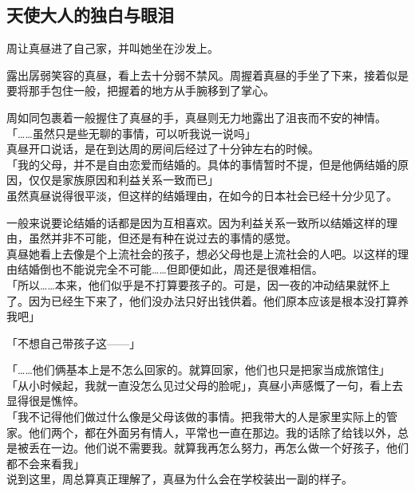 \subsection{天使大人的独白与眼泪}

周让真昼进了自己家，并叫她坐在沙发上。

露出孱弱笑容的真昼，看上去十分弱不禁风。周握着真昼的手坐了下来，接着似是要将那手包住一般，把握着的地方从手腕移到了掌心。

周如同包裹着一般握住了真昼的手，真昼则无力地露出了沮丧而不安的神情。\\

「……虽然只是些无聊的事情，可以听我说一说吗」\\

真昼开口说话，是在到达周的房间后经过了十分钟左右的时候。\\

「我的父母，并不是自由恋爱而结婚的。具体的事情暂时不提，但是他俩结婚的原因，仅仅是家族原因和利益关系一致而已」\\

虽然真昼说得很平淡，但这样的结婚理由，在如今的日本社会已经十分少见了。

一般来说要论结婚的话都是因为互相喜欢。因为利益关系一致所以结婚这样的理由，虽然并非不可能，但还是有种在说过去的事情的感觉。\\

真昼她看上去像是个上流社会的孩子，想必父母也是上流社会的人吧。以这样的理由结婚倒也不能说完全不可能……但即便如此，周还是很难相信。\\

「所以……本来，他们似乎是不打算要孩子的。可是，因一夜的冲动结果就怀上了。因为已经生下来了，他们没办法只好出钱供着。他们原本应该是根本没打算养我吧」

「不想自己带孩子这——」

「……他们俩基本上是不怎么回家的。就算回家，他们也只是把家当成旅馆住」\\

「从小时候起，我就一直没怎么见过父母的脸呢」，真昼小声感慨了一句，看上去显得很是憔悴。\\

「我不记得他们做过什么像是父母该做的事情。把我带大的人是家里实际上的管家。他们两个，都在外面另有情人，平常也一直在那边。我的话除了给钱以外，总是被丢在一边。他们说不需要我。就算我再怎么努力，再怎么做一个好孩子，他们都不会来看我」\\

说到这里，周总算真正理解了，真昼为什么会在学校装出一副的样子。\\

